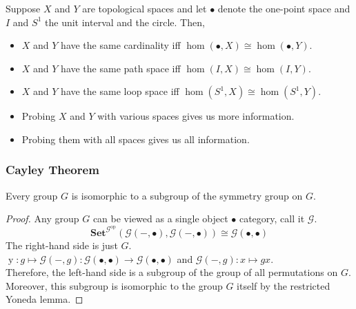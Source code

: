 \documentclass[UTF8,aspectratio=43,11pt,colorlinks,compress,openany]{beamer}%
\begin{document}
\begin{frame}\frametitle{}
Suppose $X$ and $Y$ are topological spaces and let $\bullet$ denote the one-point space and $I$ and $S^1$ the unit interval and the circle. Then,
\begin{itemize}
	\item $X$ and $Y$ have the same cardinality iff $\operatorname{hom}(\bullet,X)\cong\operatorname{hom}(\bullet,Y)$.
	\item $X$ and $Y$ have the same path space iff $\operatorname{hom}(I,X)\cong\operatorname{hom}(I,Y)$.
	\item $X$ and $Y$ have the same loop space iff $\operatorname{hom}(S^1,X)\cong\operatorname{hom}(S^1,Y)$.
	\item Probing $X$ and $Y$ with various spaces gives us more information.
	\item Probing them with all spaces gives us all information.
\end{itemize}
\end{frame}

\begin{frame}\frametitle{Cayley Theorem}
\begin{theorem}
Every group $G$ is isomorphic to a subgroup of the symmetry group on $G$.
\end{theorem}
\begin{proof}
Any group $G$ can be viewed as a single object $\bullet$ category, call it $\mathcal{G}$.
\[\mathbf{Set}^{\mathcal{G}^\mathrm{op}}(\mathcal{G}(-,\bullet),\mathcal{G}(-,\bullet))\cong\mathcal{G}(\bullet,\bullet)\]
The right-hand side is just $G$.\\
$\operatorname{y}: g\mapsto\mathcal{G}(-,g):\mathcal{G}(\bullet,\bullet)\to\mathcal{G}(\bullet,\bullet)$ and $\mathcal{G}(-,g): x\mapsto gx$.\\
Therefore, the left-hand side is a subgroup of the group of all permutations on $G$.\\
Moreover, this subgroup is isomorphic to the group $G$ itself by the restricted Yoneda lemma.
\end{proof}
\end{frame}
\end{document}
